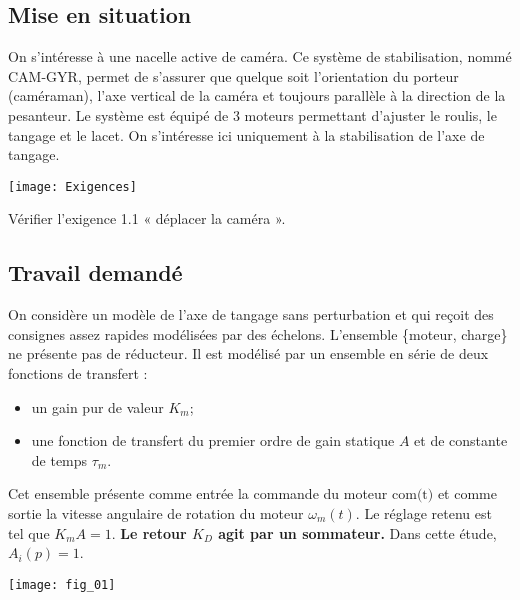 \ifprof
\else
\begin{multicols}{2}
\fi

\setcounter{exo}{0}
\subsection*{Mise en situation}
\ifprof
\else
On s'intéresse à une nacelle active de caméra. Ce système de stabilisation, nommé CAM-GYR, permet de s'assurer que quelque soit l'orientation du porteur (caméraman), l'axe vertical de la caméra et toujours parallèle à la direction de la pesanteur. 
Le système est équipé de 3 moteurs permettant d'ajuster le roulis, le tangage et le lacet. On s'intéresse ici uniquement à la stabilisation de l'axe de tangage. 

\begin{center}
\texttt{[image: Exigences]}
\end{center}
\fi
\begin{obj}
Vérifier l'exigence 1.1 « déplacer la caméra ». %
\end{obj}



\subsection*{Travail demandé}
\ifprof
\else
On considère un modèle de l’axe de tangage sans perturbation et qui reçoit des consignes assez rapides modélisées par
des échelons.
L’ensemble \{moteur, charge\} ne présente pas de réducteur. Il est modélisé par un ensemble en série de deux fonctions
de transfert :
\begin{itemize}
\item un gain pur de valeur $K_m$;%
\item une fonction de transfert du premier ordre de gain statique $A$ et de constante de temps $\tau_m$.
\end{itemize}
Cet ensemble présente comme entrée la commande du moteur $\text{com(t)}$ et comme sortie la vitesse angulaire de rotation
du moteur $\omega_m(t)$. Le réglage retenu est tel que $K_m A = 1$. \textbf{Le retour $K_D$ agit par un sommateur.}
Dans cette étude, $A_i(p)=1$.
\begin{center}
\texttt{[image: fig\_01]}


\end{center}
\end{multicols}
